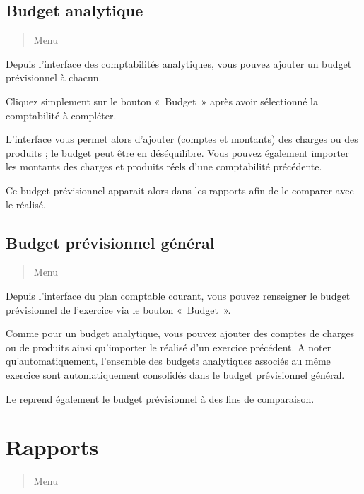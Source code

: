 \documentclass[a4paper,10pt,oneside,french]{sphinxmanual}
\begin{document}
\subsection{Budget analytique}
\label{\detokenize{accounting/budget:budget-analytique}}\begin{quote}

\sphinxAtStartPar
Menu 
\end{quote}

\sphinxAtStartPar
Depuis l’interface des comptabilités analytiques, vous pouvez ajouter un budget prévisionnel à chacun.

\sphinxAtStartPar
Cliquez simplement sur le bouton « Budget » après avoir sélectionné la comptabilité à compléter.

\sphinxAtStartPar
L’interface vous permet alors d’ajouter (comptes et montants) des charges ou des produits ; le budget peut être en déséquilibre.
Vous pouvez également importer les montants des charges et produits réels d’une comptabilité précédente.

\sphinxAtStartPar
Ce budget prévisionnel apparait alors dans les rapports afin de le comparer avec le réalisé.


\subsection{Budget prévisionnel général}
\label{\detokenize{accounting/budget:budget-previsionnel-general}}\begin{quote}

\sphinxAtStartPar
Menu 
\end{quote}

\sphinxAtStartPar
Depuis l’interface du plan comptable courant, vous pouvez renseigner le budget prévisionnel de l’exercice via le bouton « Budget ».

\sphinxAtStartPar
Comme pour un budget analytique, vous pouvez ajouter des comptes de charges ou de produits ainsi qu’importer le réalisé d’un exercice précédent.
A noter qu’automatiquement, l’ensemble des budgets analytiques associés au même exercice sont automatiquement consolidés dans le budget prévisionnel général.

\sphinxAtStartPar
Le  reprend également le budget prévisionnel à des fins de comparaison.


\section{Rapports}
\label{\detokenize{accounting/reporting:rapports}}\label{\detokenize{accounting/reporting::doc}}\begin{quote}

\sphinxAtStartPar
Menu 
\end{quote}
\end{document}
